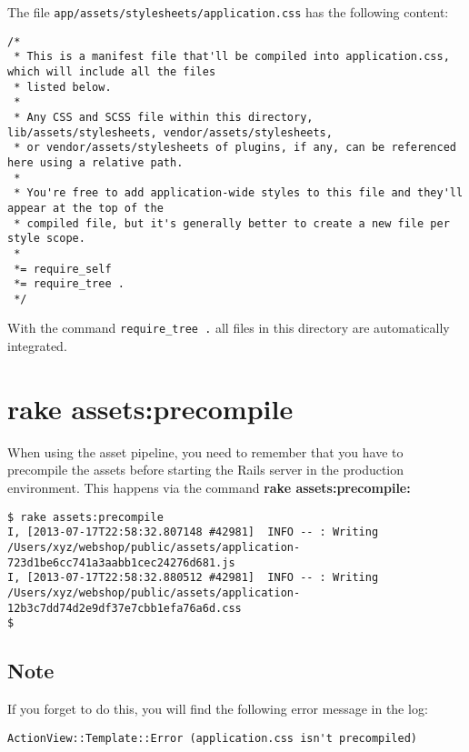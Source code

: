 \documentclass[a4paper]{book}
\begin{document}
The file \texttt{app/assets/stylesheets/application.css} has the following content:

\begin{shaded}\begin{verbatim}
/*
 * This is a manifest file that'll be compiled into application.css, which will include all the files
 * listed below.
 *
 * Any CSS and SCSS file within this directory, lib/assets/stylesheets, vendor/assets/stylesheets,
 * or vendor/assets/stylesheets of plugins, if any, can be referenced here using a relative path.
 *
 * You're free to add application-wide styles to this file and they'll appear at the top of the
 * compiled file, but it's generally better to create a new file per style scope.
 *
 *= require_self
 *= require_tree .
 */
\end{verbatim}\end{shaded}

With the command \texttt{require\_tree .} all files in this directory are automatically integrated.

\section{rake assets:precompile}\label{rake-assetsprecompile}

When using the asset pipeline, you need to remember that you have to precompile the assets before starting the Rails server in the production environment. This happens via the command \textbf{rake assets:precompile:}

\begin{shaded}\begin{verbatim}
$ rake assets:precompile
I, [2013-07-17T22:58:32.807148 #42981]  INFO -- : Writing /Users/xyz/webshop/public/assets/application-723d1be6cc741a3aabb1cec24276d681.js
I, [2013-07-17T22:58:32.880512 #42981]  INFO -- : Writing /Users/xyz/webshop/public/assets/application-12b3c7dd74d2e9df37e7cbb1efa76a6d.css
$
\end{verbatim}\end{shaded}

\subsection{Note}\label{note-50}

If you forget to do this, you will find the following error message in the log:

\begin{shaded}\begin{verbatim}
ActionView::Template::Error (application.css isn't precompiled)
\end{verbatim}\end{shaded}
\end{document}
